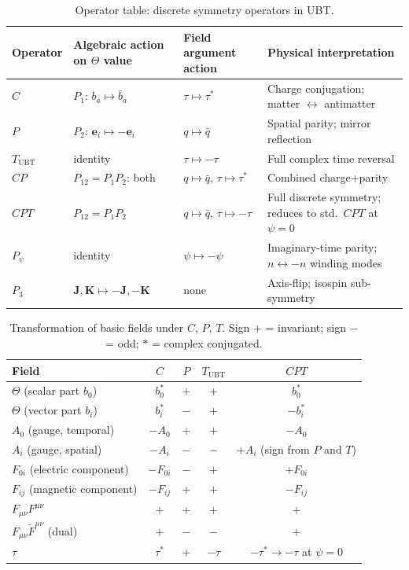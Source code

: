 \documentclass[12pt,a4paper]{article}
\theoremstyle{definition}
\theoremstyle{remark}
\begin{document}
\begin{table}[h]
\centering
\caption{Operator table: discrete symmetry operators in UBT.}
\label{tab:ds:operators}
\small
\begin{tabular}{@{}p{2cm}p{4cm}p{4.5cm}p{3.5cm}@{}}
\toprule
Operator & Algebraic action on $\Theta$ value & Field argument action & Physical interpretation \\
\midrule
$C$ & $P_1$: $b_a \mapsto \bar{b}_a$ & $\tau \mapsto \tau^*$ & Charge conjugation; matter $\leftrightarrow$ antimatter \\
$P$ & $P_2$: $\mathbf{e}_i \mapsto -\mathbf{e}_i$ & $q \mapsto \bar{q}$ & Spatial parity; mirror reflection \\
$T_{\mathrm{UBT}}$ & identity & $\tau \mapsto -\tau$ & Full complex time reversal \\
$CP$ & $P_{12}= P_1 P_2$: both & $q\mapsto\bar{q}$, $\tau\mapsto\tau^*$ & Combined charge+parity \\
$CPT$ & $P_{12}= P_1 P_2$ & $q\mapsto\bar{q}$, $\tau\mapsto-\tau$ & Full discrete symmetry; reduces to std.\ $CPT$ at $\psi=0$ \\
$P_\psi$ & identity & $\psi\mapsto-\psi$ & Imaginary-time parity; $n \leftrightarrow -n$ winding modes \\
$P_3$ & $\mathbf{J},\mathbf{K}\mapsto-\mathbf{J},-\mathbf{K}$ & none & Axis-flip; isospin sub-symmetry \\
\bottomrule
\end{tabular}
\end{table}

\begin{table}[h]
\centering
\caption{Transformation of basic fields under $C$, $P$, $T$.
  Sign $+$ = invariant; sign $-$ = odd; $*$ = complex conjugated.}
\label{tab:ds:fieldtransf}
\begin{tabular}{@{}lcccc@{}}
\toprule
Field & $C$ & $P$ & $T_{\mathrm{UBT}}$ & $CPT$ \\
\midrule
$\Theta$ (scalar part $b_0$)     & $b_0^*$ & $+$ & $+$ & $b_0^*$ \\
$\Theta$ (vector part $b_i$)     & $b_i^*$ & $-$ & $+$ & $-b_i^*$ \\
$A_0$ (gauge, temporal)          & $-A_0$  & $+$ & $+$ & $-A_0$ \\
$A_i$ (gauge, spatial)           & $-A_i$  & $-$ & $-$ & $+A_i$ (sign from $P$ and $T$) \\
$F_{0i}$ (electric component)    & $-F_{0i}$ & $-$ & $+$ & $+F_{0i}$ \\
$F_{ij}$ (magnetic component)    & $-F_{ij}$ & $+$ & $+$ & $-F_{ij}$ \\
$F_{\mu\nu}F^{\mu\nu}$           & $+$     & $+$ & $+$ & $+$ \\
$F_{\mu\nu}\tilde{F}^{\mu\nu}$ (dual) & $+$ & $-$ & $-$ & $+$ \\
$\tau$                           & $\tau^*$ & $+$ & $-\tau$ & $-\tau^*\to-\tau$ at $\psi=0$ \\
\bottomrule
\end{tabular}
\end{table}
\end{document}
